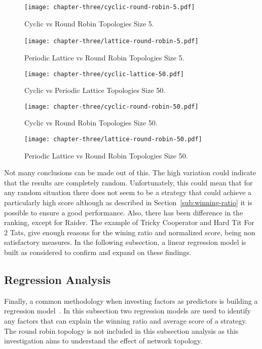 \begin{figure}[H]
	\centering
	\texttt{[image: chapter-three/cyclic-round-robin-5.pdf]}\
	\caption{Cyclic vs Round Robin Topologies Size 5.}
	\label{fig:score-rankings-five-c-r}
\end{figure}

\begin{figure}[H]
	\centering
	\texttt{[image: chapter-three/lattice-round-robin-5.pdf]}\
	\caption{Periodic Lattice vs Round
	Robin Topologies Size 5.}
	\label{fig:score-rankings-five-l-r}
\end{figure}

\begin{figure}[H]
	\centering
	\texttt{[image: chapter-three/cyclic-lattice-50.pdf]}
	\caption{Cyclic vs Periodic Lattice Topologies Size 50.}
	\label{fig:score-rankings-fifty-c-l}
\end{figure}

\begin{figure}[H]
	\centering
	\texttt{[image: chapter-three/cyclic-round-robin-50.pdf]}
	\caption{Cyclic vs Round Robin Topologies Size 50.}
	\label{fig:score-rankings-fifty-c-r}
\end{figure}

\begin{figure}[H]
	\centering
	\texttt{[image: chapter-three/lattice-round-robin-50.pdf]}
	\caption{Periodic Lattice vs Round Robin Topologies Size 50.}
	\label{fig:score-rankings-fifty-l-r}
\end{figure}

Not many conclusions can be made out of this. The high variation could indicate
that the results are completely random. Unfortunately, this could mean that for
any random situation there does not seem to be a strategy that could
achieve a particularly high score although as described in Section~\ref{sub:winning-ratio}
it is possible to ensure a good performance. Also, there has been difference in
the ranking, except for Raider. The example of Tricky Cooperator and Hard Tit For 2 Tats,
give enough reasons for the wining ratio and normalized score, being non satisfactory
measures. In the following subsection, a linear regression model is built as
considered to confirm and expand on these findings.

\subsection{Regression Analysis}
\label{sub:regression}
Finally, a common methodology when investing factors as predictors is building a
regression model~\cite{Bingham2010}. In this subsection two regression models are
used to identify any factors that can explain the winning ratio and average score
of a strategy. The round robin topology is not included in this subsection analysis
as this investigation aims to understand the effect of network topology.

